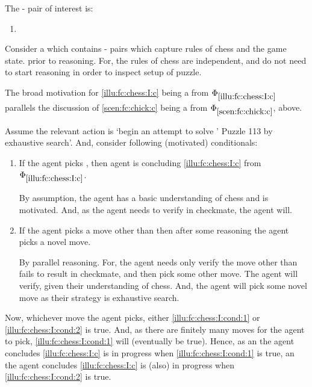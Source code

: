 \begin{note}
  The - pair of interest is:

  \begin{enumerate}[label=C\thescenarioCounter., ref=C\thescenarioCounter]
  \item
    \label{illu:fc:chess:I:c}
  \end{enumerate}
  Consider a \pool{} which contains - pairs which capture rules of chess and the game state.
  \pool{} prior to reasoning.
  For, the rules of chess are independent, and do not need to start reasoning in order to inspect setup of puzzle.

  The broad motivation for \ref{illu:fc:chess:I:c} being a \fc{} from \(\Phi_{\ref{illu:fc:chess:I:c}}\) parallels the discussion of  \ref{scen:fc:chick:c} being a \fc{} from \(\Phi_{\ref{scen:fc:chick:c}}\), above.

  Assume the relevant action is `begin an attempt to solve \citeauthor{Emms:2000aa}' Puzzle 113 by exhaustive search'.
  And, consider following (motivated) conditionals:

  \begin{enumerate}[label=\arabic*., ref=(\arabic*)]
  \item
    \label{illu:fc:chess:I:cond:1}
    If the agent picks , then agent is concluding \ref{illu:fc:chess:I:c} from \(\Phi_{\ref{illu:fc:chess:I:c}}\).
    \smallskip

    By assumption, the agent has a basic understanding of chess and is motivated.
    And, as the agent needs to verify  in checkmate, the agent will.
  \item
    \label{illu:fc:chess:I:cond:2}
    If the agent picks a move other than  then after some reasoning the agent picks a novel move.%
    \smallskip

    By parallel reasoning.
    For, the agent needs only verify the move other than  fails to result in checkmate, and then pick some other move.
    The agent will verify, given their understanding of chess.
    And, the agent will pick some novel move as their strategy is exhaustive search.
  \end{enumerate}
  Now, whichever move the agent picks, either \ref{illu:fc:chess:I:cond:1} or \ref{illu:fc:chess:I:cond:2} is true.
  And, as there are finitely many moves for the agent to pick, \ref{illu:fc:chess:I:cond:1} will (eventually be true).
  Hence, as an  the agent concludes \ref{illu:fc:chess:I:c} is in progress when \ref{illu:fc:chess:I:cond:1} is true, an  the agent concludes \ref{illu:fc:chess:I:c} is (also) in progress when \ref{illu:fc:chess:I:cond:2} is true.
\end{note}

